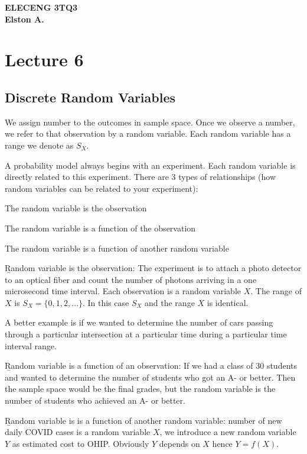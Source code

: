 \documentclass[12pt, titlepage, oneside]{article}
\begin{document}
	
	\textbf{ELECENG 3TQ3}\\
	\textbf{Elston A.}
	
\section{Lecture 6}

\subsection{Discrete Random Variables}

We assign number to the outcomes in sample space. Once we observe a number, we refer to that observation by a random variable.
Each random variable has a range we denote as $S_X$.



A probability model always begins with an experiment. Each random variable is directly related to this experiment. There are 3 types of relationships (how random variables can be related to your experiment):

\items
\item The random variable is the observation
\item The random variable is a function of the observation
\item The random variable is a function of another random variable
\eitems

\b{Random variable is the observation:} The experiment is to attach a photo detector to an optical fiber and count the number of photons arriving in a one microsecond time interval. Each observation is a random variable $X$. The range of $X$ is $S_X = \{0,1,2,\dots\}$. In this case $S_X$ and the range $X$ is identical.

A better example is if we wanted to determine the number of cars passing through a particular intersection at a particular time during a particular time interval range.

\b{Random variable is a function of an observation}: If we had a class of 30 students and wanted to determine the number of students who got an A- or better. Then the sample space would be the final grades, but the random variable is the number of students who achieved an A- or better. 

\b{Random variable is  is a function of another random variable}: number of new daily COVID cases is a random variable $X$, we introduce a new random variable $Y$ as estimated cost to OHIP. Obviously $Y$ depends on $X$ hence $Y=f(X)$. 
	
\end{document}
